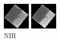 \documentclass[a4paper,12pt]{article}  %
\begin{document}
\begin{figure}[H]
    \centering
    \begin{minipage}{0.24\textwidth}
        \centering
        \includegraphics[width=\linewidth]{spektralne/nir_budynek7.png}
        \caption*{NIR}
    \end{minipage}
    \begin{minipage}{0.24\textwidth}
        \centering
        \includegraphics[width=\linewidth]{spektralne/red_budynek7.png}

\end{minipage}
\end{figure}
\end{document}
